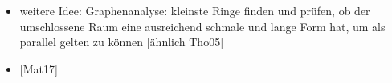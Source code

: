 \documentclass[../main/thesis.tex]{subfiles}
\begin{document}
\begin{itemize}
\item weitere Idee: Graphenanalyse: kleinste Ringe finden und prüfen, ob der umschlossene Raum eine ausreichend schmale und lange Form hat, um als parallel gelten zu können [ähnlich Tho05]
\item {[Mat17]}
\end{itemize}




\end{document}
